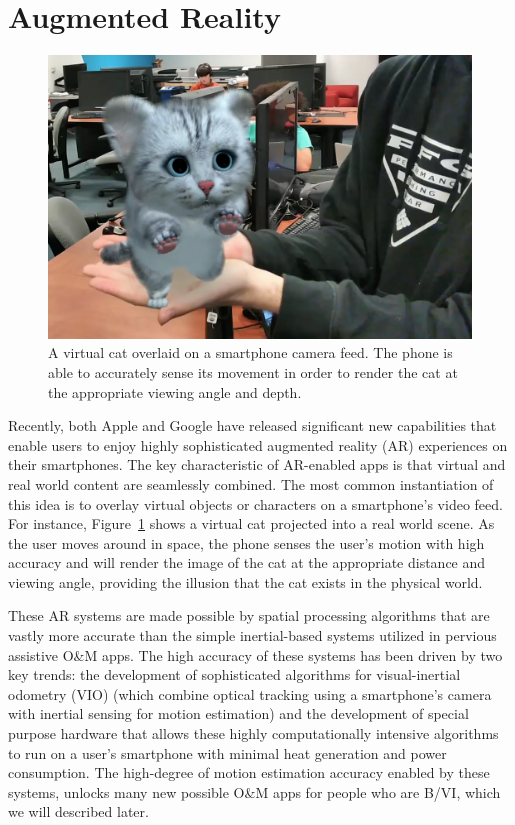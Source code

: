 \documentclass[chi_draft]{sigchi}
\newcommand{\BVI}{B/VI\xspace}
\newcommand{\OM}{O\&M\xspace}
\begin{document}
\section{Augmented Reality}

\begin{figure}
\begin{center}
\includegraphics[width=.9\linewidth]{Figures/arexample.png}
\end{center}
\caption{A virtual cat overlaid on a smartphone camera feed.  The phone is able to accurately sense its movement in order to render the cat at the appropriate viewing angle and depth.\label{fig:arexample}}
\end{figure}

Recently, both Apple and Google have released significant new capabilities that enable users to enjoy highly sophisticated augmented reality (AR) experiences on their smartphones.  The key characteristic of AR-enabled apps is that virtual and real world content are seamlessly combined.  The most common instantiation of this idea is to overlay virtual objects or characters on a smartphone's video feed.  For instance, Figure~\ref{fig:arexample} shows a virtual cat projected into a real world scene.  As the user moves around in space, the phone senses the user's motion with high accuracy and will render the image of the cat at the appropriate distance and viewing angle, providing the illusion that the cat exists in the physical world.

These AR systems are made possible by spatial processing algorithms that are vastly more accurate than the simple inertial-based systems utilized in pervious assistive \OM apps.  The high accuracy of these systems has been driven by two key trends: the development of sophisticated algorithms for visual-inertial odometry (VIO) \cite{li2013high,leutenegger2015keyframe,bloesch2015robust,forster2014svo} (which combine optical tracking using a smartphone's camera with inertial sensing for motion estimation) and the development of special purpose hardware that allows these highly computationally intensive algorithms to run on a user's smartphone with minimal heat generation and power consumption.  The high-degree of motion estimation accuracy enabled by these systems, unlocks many new possible \OM apps for people who are \BVI, which we will described later.
\end{document}
